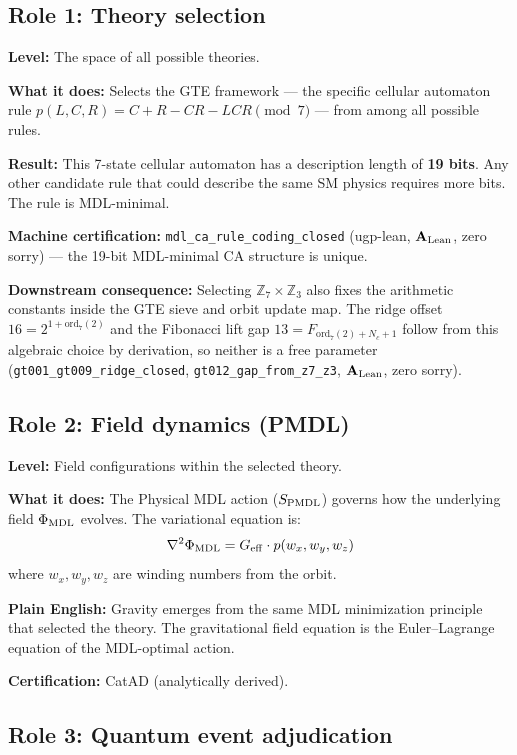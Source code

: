 \documentclass[11pt,a4paper]{article}
\newcommand{\lean}[1]{\texttt{#1}}
\newcommand{\CatAL}{\ensuremath{\mathbf{A}_{\rm Lean}}}
\begin{document}
\subsection{Role 1: Theory selection}

\textbf{Level:} The space of all possible theories.

\textbf{What it does:} Selects the GTE framework — the specific cellular automaton rule
$p(L,C,R) = C + R - CR - LCR \pmod{7}$ — from among all possible rules.

\textbf{Result:} This 7-state cellular automaton has a description length of \textbf{19 bits}.
Any other candidate rule that could describe the same SM physics requires more bits.
The rule is MDL-minimal.

\textbf{Machine certification:} \lean{mdl\_ca\_rule\_coding\_closed} (ugp-lean, \CatAL,
zero sorry) — the 19-bit MDL-minimal CA structure is unique.

\textbf{Downstream consequence:} Selecting $\mathbb{Z}_7 \times \mathbb{Z}_3$ also
fixes the arithmetic constants inside the GTE sieve and orbit update map.
The ridge offset $16 = 2^{1+\mathrm{ord}_7(2)}$ and the Fibonacci lift gap
$13 = F_{\mathrm{ord}_7(2)+N_c+1}$ follow from this algebraic choice
by derivation, so neither is a free parameter
(\lean{gt001\_gt009\_ridge\_closed}, \lean{gt012\_gap\_from\_z7\_z3},
\CatAL, zero sorry).

\subsection{Role 2: Field dynamics (PMDL)}

\textbf{Level:} Field configurations within the selected theory.

\textbf{What it does:} The Physical MDL action ($S_{\rm PMDL}$) governs how the
underlying field $\Phi_{\rm MDL}$ evolves.  The variational equation is:
\[
  \nabla^2 \Phi_{\rm MDL} = G_{\rm eff} \cdot p(w_x, w_y, w_z)
\]
where $w_x, w_y, w_z$ are winding numbers from the orbit.

\textbf{Plain English:} Gravity emerges from the same MDL minimization principle
that selected the theory.  The gravitational field equation is the Euler–Lagrange
equation of the MDL-optimal action.

\textbf{Certification:} CatAD (analytically derived).

\subsection{Role 3: Quantum event adjudication}
\end{document}
